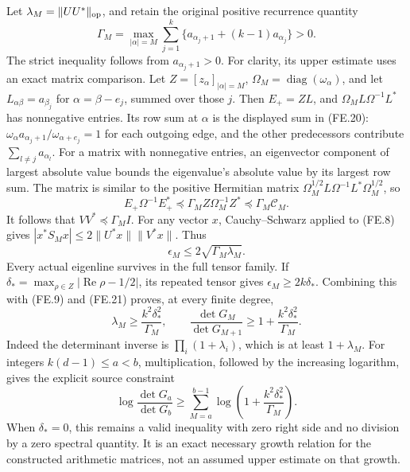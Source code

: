 Let \(\lambda_M=\|UU^*\|_{\rm op}\), and retain the original
positive recurrence quantity
\[
 \Gamma_M=\max_{|\alpha|=M}
   \sum_{j=1}^k\{a_{\alpha_j+1}+(k-1)a_{\alpha_j}\}>0.
 \tag{FE.20}
\]
The strict inequality follows from \(a_{\alpha_j+1}>0\).
For clarity, its upper estimate uses an exact matrix comparison.
Let \(Z=[z_\alpha]_{|\alpha|=M}\),
\(\Omega_M=\operatorname{diag}(\omega_\alpha)\), and let
\(L_{\alpha\beta}=a_{\beta_j}\) for
\(\alpha=\beta-e_j\), summed over those \(j\).
Then \(E_+=ZL\), and
\(\Omega_ML\Omega^{-1}L^*\) has nonnegative entries.
Its row sum at \(\alpha\) is the displayed sum in (FE.20):
\(\omega_\alpha a_{\alpha_j+1}/\omega_{\alpha+e_j}=1\)
for each outgoing edge, and the other predecessors contribute
\(\sum_{l\ne j}a_{\alpha_l}\).  For a matrix with
nonnegative entries, an eigenvector component of largest absolute
value bounds the eigenvalue's absolute value by its largest row
sum.  The matrix is similar to the positive Hermitian matrix
\(\Omega_M^{1/2}L\Omega^{-1}L^*\Omega_M^{1/2}\), so
\[
 E_+\Omega^{-1}E_+^*\preceq
       \Gamma_M Z\Omega_M^{-1}Z^*
       \preceq\Gamma_M\mathcal C_M.
\]
It follows that \(VV^*\preceq\Gamma_MI\).
For any vector \(x\), Cauchy--Schwarz applied to (FE.8)
gives \(|x^*S_Mx|\le2\|U^*x\|\|V^*x\|\).
Thus
\[
 \epsilon_M\le2\sqrt{\Gamma_M\lambda_M}.               \tag{FE.21}
\]
Every actual eigenline survives in the full tensor family.  If
\(\delta_* =\max_{\rho\in Z}|\operatorname{Re}\rho-1/2|\),
its repeated tensor gives
\(\epsilon_M\ge2k\delta_*\).  Combining this with
(FE.9) and (FE.21) proves, at every finite degree,
\[
 \lambda_M\ge\frac{k^2\delta_*^2}{\Gamma_M},\qquad
 \frac{\det G_M}{\det G_{M+1}}\ge
       1+\frac{k^2\delta_*^2}{\Gamma_M}.
 \tag{FE.22}
\]
Indeed the determinant inverse is \(\prod_i(1+\lambda_i)\),
which is at least \(1+\lambda_M\).  For integers
\(k(d-1)\le a<b\), multiplication, followed by the increasing logarithm,
gives the explicit source constraint
\[
 \boxed{\log\frac{\det G_a}{\det G_b}\ge
    \sum_{M=a}^{b-1}\log\left(1+
                  \frac{k^2\delta_*^2}{\Gamma_M}\right).}
 \tag{FE.23}
\]
When \(\delta_*=0\), this remains a valid inequality with
zero right side and no division by a zero spectral quantity.
It is an exact necessary growth relation for the constructed
arithmetic matrices, not an assumed upper estimate on that growth.


